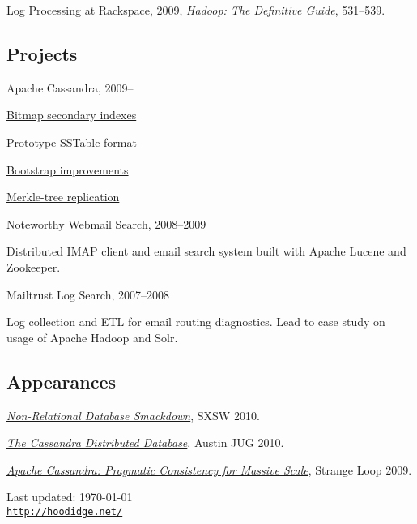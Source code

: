 \documentclass[letterpaper]{article}
\def\footerlink{http://hoodidge.net/}
\renewenvironment{itemize}{
  \begin{list}{}{
    \setlength{\leftmargin}{1.5em}
  }
}{
  \end{list}
}
\begin{document}
\begin{itemize}
  \item Log Processing at Rackspace, 2009, {\it Hadoop: The Definitive Guide}, 531--539.
\end{itemize}

\subsection*{Projects}

\begin{itemize}
  \item Apache Cassandra, 2009--
  \begin{itemize}
    \item \href{https://issues.apache.org/jira/browse/CASSANDRA-1472}{Bitmap secondary indexes}
    \item \href{https://issues.apache.org/jira/browse/CASSANDRA-674}{Prototype SSTable format}
    \item \href{https://issues.apache.org/jira/browse/CASSANDRA-579}{Bootstrap improvements}
    \item \href{https://issues.apache.org/jira/browse/CASSANDRA-193}{Merkle-tree replication}
  \end{itemize}
  \item Noteworthy Webmail Search, 2008--2009
  \begin{itemize}
    \item Distributed IMAP client and email search system built with Apache Lucene and Zookeeper.
  \end{itemize}
  \item Mailtrust Log Search, 2007--2008
  \begin{itemize}
    \item Log collection and ETL for email routing diagnostics. Lead to case study on usage of Apache Hadoop and Solr.
  \end{itemize}
\end{itemize}

\subsection*{Appearances}

\begin{itemize}
  \item \href{http://www.rackspacecloud.com/blog/2010/06/23/compare-nosql-options-by-watching-the-%E2%80%9Cnon-relational-database-smackdown%E2%80%9D/}{\it Non-Relational Database Smackdown}, SXSW 2010.
  \item \href{http://www.austinjug.org/index.jsp?p=archive-20100126}{\it The Cassandra Distributed Database}, Austin JUG 2010.
  \item \href{http://thestrangeloop.com/blog/09/09/30/speaker-focus-stu-hood-cassandra}{\it Apache Cassandra: Pragmatic Consistency for Massive Scale}, Strange Loop 2009.
\end{itemize}

\bigskip

\begin{center}
  \begin{footnotesize}
    Last updated: \today \\
    \href{\footerlink}{\texttt{\footerlink}}
  \end{footnotesize}
\end{center}
\end{document}
